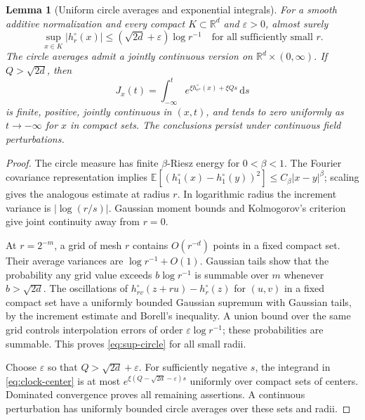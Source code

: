 \documentclass[11pt,reqno]{amsart}
\theoremstyle{plain}
\newtheorem{lemma}[theorem]{Lemma}
\theoremstyle{definition}
\theoremstyle{remark}
\newcommand{\R}{\mathbb R}
\newcommand{\E}{\mathbb E}
\newcommand{\1}{\mathbf{1}}
\newcommand{\dd}{\,\mathrm d}
\begin{document}
\begin{lemma}[Uniform circle averages and exponential integrals]\label{lem:uniform-circle}
For a smooth additive normalization and every compact $K\subset\R^d$ and $\varepsilon>0$, almost surely
\begin{equation}\label{eq:sup-circle}
\sup_{x\in K}|h_r^\circ(x)|\le (\sqrt{2d}+\varepsilon)\log r^{-1}
\quad\text{for all sufficiently small }r.
\end{equation}
The circle averages admit a jointly continuous version on $\R^d\times(0,\infty)$. If $Q>\sqrt{2d}$, then
\begin{equation}\label{eq:clock-center}
J_x(t)=\int_{-\infty}^t e^{\xi h_{e^s}^\circ(x)+\xi Qs}\dd s
\end{equation}
is finite, positive, jointly continuous in $(x,t)$, and tends to zero uniformly as $t\to-\infty$ for $x$ in compact sets. The conclusions persist under continuous field perturbations.
\end{lemma}
\begin{proof}
The circle measure has finite $\beta$-Riesz energy for $0<\beta<1$. The Fourier covariance representation implies
$\E[(h_1^\circ(x)-h_1^\circ(y))^2]\le C_\beta|x-y|^\beta$; scaling gives the analogous estimate at radius $r$. In logarithmic radius the increment variance is $|\log(r/s)|$. Gaussian moment bounds and Kolmogorov's criterion give joint continuity away from $r=0$.

At $r=2^{-m}$, a grid of mesh $r$ contains $O(r^{-d})$ points in a fixed compact set. Their average variances are $\log r^{-1}+O(1)$. Gaussian tails show that the probability any grid value exceeds $b\log r^{-1}$ is summable over $m$ whenever $b>\sqrt{2d}$. The oscillations of $h_{rv}^\circ(z+ru)-h_r^\circ(z)$ for $(u,v)$ in a fixed compact set have a uniformly bounded Gaussian supremum with Gaussian tails, by the increment estimate and Borell's inequality. A union bound over the same grid controls interpolation errors of order $\varepsilon\log r^{-1}$; these probabilities are summable. This proves \eqref{eq:sup-circle} for all small radii.

Choose $\varepsilon$ so that $Q>\sqrt{2d}+\varepsilon$. For sufficiently negative $s$, the integrand in \eqref{eq:clock-center} is at most $e^{\xi(Q-\sqrt{2d}-\varepsilon)s}$ uniformly over compact sets of centers. Dominated convergence proves all remaining assertions. A continuous perturbation has uniformly bounded circle averages over these sets and radii.
\end{proof}
\end{document}
